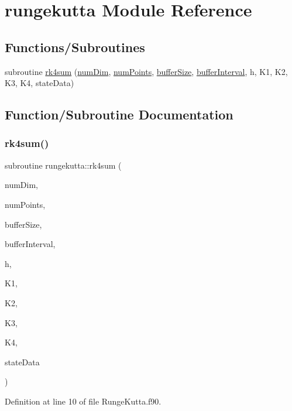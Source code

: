 \hypertarget{namespacerungekutta}{}\section{rungekutta Module Reference}
\label{namespacerungekutta}
\subsection*{Functions/\+Subroutines}
\begin{DoxyCompactItemize}
\item 
subroutine \hyperlink{namespacerungekutta_a265553b049764e513a864c65b65a53b2}{rk4sum} (\hyperlink{SATKernels_8H_a680185db8546de161968dabace9e94f1}{num\+Dim}, \hyperlink{ViscidKernels_8H_adf0bf75d0875d1bb42a5348bee7b7bfd}{num\+Points}, \hyperlink{SpecialKernels_8H_aa9426cdf16e85054db35e88f9b68c6be}{buffer\+Size}, \hyperlink{WENOKernels_8H_ad1001168d5432b52e6d0636f4dc0e60c}{buffer\+Interval}, h, K1, K2, K3, K4, state\+Data)
\end{DoxyCompactItemize}


\subsection{Function/\+Subroutine Documentation}
\hypertarget{namespacerungekutta_a265553b049764e513a864c65b65a53b2}{}\label{namespacerungekutta_a265553b049764e513a864c65b65a53b2} 
\subsubsection{\texorpdfstring{rk4sum()}{rk4sum()}}
{\footnotesize\ttfamily subroutine rungekutta\+::rk4sum (\begin{DoxyParamCaption}\item[{integer(kind=4), intent(in)}]{num\+Dim,  }\item[{integer(kind=8), intent(in)}]{num\+Points,  }\item[{integer(kind=8), dimension(numdim), intent(in)}]{buffer\+Size,  }\item[{integer(kind=8), dimension(2$\ast$numdim), intent(in)}]{buffer\+Interval,  }\item[{real(kind=8), intent(in)}]{h,  }\item[{real(kind=8), dimension(numpoints), intent(in)}]{K1,  }\item[{real(kind=8), dimension(numpoints), intent(in)}]{K2,  }\item[{real(kind=8), dimension(numpoints), intent(in)}]{K3,  }\item[{real(kind=8), dimension(numpoints), intent(in)}]{K4,  }\item[{real(kind=8), dimension(numpoints), intent(inout)}]{state\+Data }\end{DoxyParamCaption})}



Definition at line 10 of file Runge\+Kutta.\+f90.

